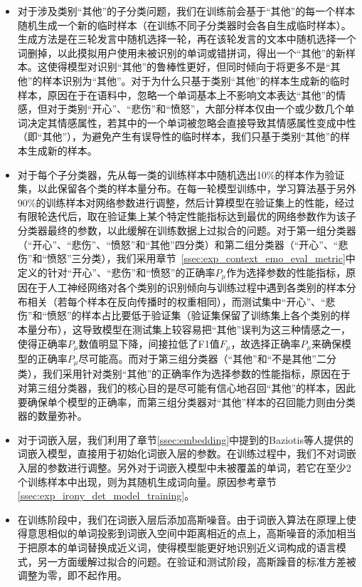 \begin{itemize}

\item 对于涉及类别“其他”的子分类问题，我们在训练前会基于“其他”的每一个样本随机生成一个新的临时样本（在训练不同子分类器时会各自生成临时样本）。生成方法是在三轮发言中随机选择一轮，再在该轮发言的文本中随机选择一个词删掉，以此摸拟用户使用未被识别的单词或错拼词，得出一个“其他”的新样本。这使得模型对识别“其他”的鲁棒性更好，但同时倾向于将更多不是“其他”的样本识别为“其他”。对于为什么只基于类别“其他”的样本生成新的临时样本，原因在于在语料中，忽略一个单词基本上不影响文本表达“其他”的情感，但对于类别“开心”、“悲伤”和“愤怒”，大部分样本仅由一个或少数几个单词决定其情感属性，若其中的一个单词被忽略会直接导致其情感属性变成中性（即“其他”），为避免产生有误导性的临时样本，我们只基于类别“其他”的样本生成新的样本。

\item 对于每个子分类器，先从每一类的训练样本中随机选出10\%的样本作为验证集，以此保留各个类的样本量分布。在每一轮模型训练中，学习算法基于另外90\%的训练样本对网络参数进行调整，然后计算模型在验证集上的性能，经过有限轮迭代后，取在验证集上某个特定性能指标达到最优的网络参数作为该子分类器最终的参数，以此缓解在训练数据上过拟合的问题。对于第一组分类器（“开心”、“悲伤”、“愤怒”和“其他”四分类）和第二组分类器（“开心”、“悲伤”和“愤怒”三分类），我们采用章节~\ref{ssec:exp_context_emo_eval_metric}中定义的针对“开心”、“悲伤”和“愤怒”的正确率$P_\mu$作为选择参数的性能指标，原因在于人工神经网络对各个类别的识别倾向与训练过程中遇到各类别的样本分布相关（若每个样本在反向传播时的权重相同），而测试集中“开心”、“悲伤”和“愤怒”的样本占比要低于验证集（验证集保留了训练集上各个类别的样本量分布），这导致模型在测试集上较容易把“其他”误判为这三种情感之一，使得正确率$P_\mu$数值明显下降，间接拉低了F1值$F_\mu$，故选择正确率$P_\mu$来确保模型的正确率$P_\mu$尽可能高。而对于第三组分类器（“其他”和“不是其他”二分类），我们采用针对类别“其他”的正确率作为选择参数的性能指标，原因在于对第三组分类器，我们的核心目的是尽可能有信心地召回“其他”的样本，因此要确保单个模型的正确率，而第三组分类器对“其他”样本的召回能力则由分类器的数量弥补。

\item 对于词嵌入层，我们利用了章节\ref{ssec:embedding}中提到的Baziotis等人\cite{baziotis2018ntua}提供的词嵌入模型，直接用于初始化词嵌入层的参数。在训练过程中，我们不对词嵌入层的参数进行调整。另外对于词嵌入模型中未被覆盖的单词，若它在至少2个训练样本中出现，则为其随机生成词向量。原因参考章节\ref{ssec:exp_irony_det_model_training}。

\item 在训练阶段中，我们在词嵌入层后添加高斯噪音。由于词嵌入算法在原理上使得意思相似的单词投影到词嵌入空间中距离相近的点上，高斯噪音的添加相当于把原本的单词替换成近义词，使得模型能更好地识别近义词构成的语言模式，另一方面缓解过拟合的问题。在验证和测试阶段，高斯躁音的标准方差被调整为零，即不起作用。


\end{itemize}
